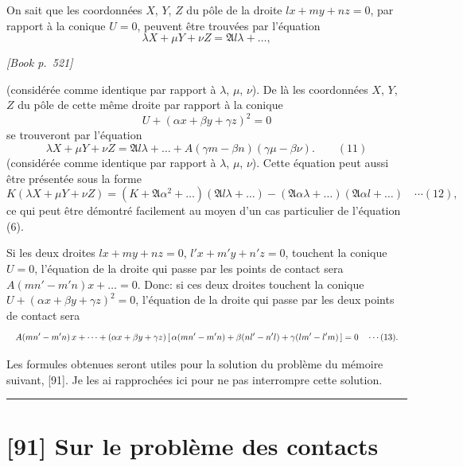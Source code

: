\documentclass[11pt]{article}
\begin{document}
On sait que les coordonn\'ees $X$, $Y$, $Z$ du p\^ole de la droite $l x + m y + n z = 0$, par rapport \`a la conique $U = 0$, peuvent \^etre trouv\'ees par l'\'equation
\[
\lambda X + \mu Y + \nu Z = \mathfrak{A} l \lambda + \dots,
\]

\medskip
\noindent\textit{[Book p.~521]}\hfill

\smallskip

\noindent (consid\'er\'ee comme identique par rapport \`a $\lambda$, $\mu$, $\nu$). De l\`a les coordonn\'ees $X$, $Y$, $Z$ du p\^ole de cette m\^eme droite par rapport \`a la conique
\[
U + (\alpha x + \beta y + \gamma z)^{2} = 0
\]
se trouveront par l'\'equation
\[
\lambda X + \mu Y + \nu Z = \mathfrak{A} l \lambda + \dots + A(\gamma m - \beta n)(\gamma\mu - \beta\nu). \qquad (11)
\]
(consid\'er\'ee comme identique par rapport \`a $\lambda$, $\mu$, $\nu$). Cette \'equation peut aussi \^etre pr\'esent\'ee sous la forme
\[
K(\lambda X + \mu Y + \nu Z) = (K + \mathfrak{A}\alpha^{2} + \dots)(\mathfrak{A} l \lambda + \dots) - (\mathfrak{A}\alpha\lambda + \dots)(\mathfrak{A}\alpha l + \dots) \quad \cdots (12),
\]
ce qui peut \^etre d\'emontr\'e facilement au moyen d'un cas particulier de l'\'equation (6).

Si les deux droites $l x + m y + n z = 0$, $l' x + m' y + n' z = 0$, touchent la conique $U = 0$, l'\'equation de la droite qui passe par les points de contact sera $A(m n' - m' n) x + \dots = 0$. Donc: si ces deux droites touchent la conique $U + (\alpha x + \beta y + \gamma z)^{2} = 0$, l'\'equation de la droite qui passe par les deux points de contact sera
\[ \resizebox{\textwidth}{!}{$\displaystyle
A(m n' - m' n)\,x + \dots + (\alpha x + \beta y + \gamma z)\,[\,\alpha(m n' - m' n) + \beta(n l' - n' l) + \gamma(l m' - l' m)\,] = 0 \quad \cdots (13).
$} \]

Les formules obtenues seront utiles pour la solution du probl\`eme du m\'emoire suivant, [91]. Je les ai rapproch\'ees ici pour ne pas interrompre cette solution.

\bigskip
\hrule
\bigskip


\section*{[91] Sur le probl\`eme des contacts}
\end{document}
